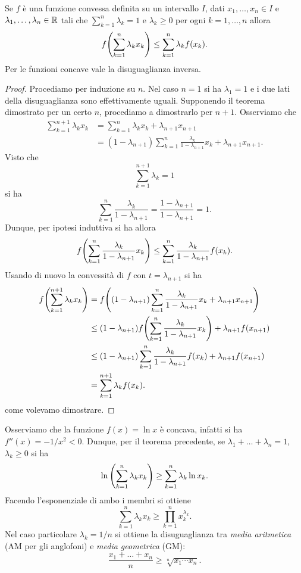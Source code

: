 \begin{theorem}
\mymark{*}
Se $f$ è una funzione convessa definita su un intervallo $I$, dati $x_1, \dots, x_n \in I$ e $\lambda_1, \dots, \lambda_n\in \mathbb R$ tali che $\sum_{k=1}^n \lambda_k = 1$ e $\lambda_k \ge 0$ per ogni $k=1, \dots, n$ allora
\[
  f{\left( \sum_{k=1}^n \lambda_k x_k \right)}
  \le \sum_{k=1}^n \lambda_k f(x_k).
\]
Per le funzioni concave vale la disuguaglianza inversa.
\end{theorem}
%
\begin{proof}
Procediamo per induzione su $n$. Nel caso $n=1$ si ha $\lambda_1=1$ e i due lati della disuguaglianza sono effettivamente uguali. Supponendo il teorema dimostrato per un certo $n$, procediamo a dimostrarlo per $n+1$.
Osserviamo che
\begin{align*}
  \sum_{k=1}^{n+1} \lambda_k x_k
  &= \sum_{k=1}^n \lambda_k x_k  + \lambda_{n+1} x_{n+1} \\
  &= (1-\lambda_{n+1})\sum_{k=1}^n\frac{\lambda_k}{1-\lambda_{n+1}} x_k + \lambda_{n+1} x_{n+1}.
\end{align*}
Visto che
\[
  \sum_{k=1}^{n+1} \lambda_k = 1
\]
si ha
\[
  \sum_{k=1}^n \frac{\lambda_k}{1-\lambda_{n+1}}
  = \frac{1-\lambda_{n+1}}{1-\lambda_{n+1}} = 1.
\]
Dunque, per ipotesi induttiva si ha allora
\[
  f{\left( \sum_{k=1}^n\frac{\lambda_k}{1-\lambda_{n+1}} x_k \right)}
  \le \sum_{k=1}^n \frac{\lambda_k}{1-\lambda_{n+1}}f(x_k).
\]
Usando di nuovo la convessità di $f$ con $t=\lambda_{n+1}$ si ha
\begin{align*}
f{\left( \sum_{k=1}^{n+1} \lambda_k x_k \right)}
&=f{\left( (1-\lambda_{n+1})\sum_{k=1}^n \frac{\lambda_k}{1-\lambda_{n+1}}x_k + \lambda_{n+1}x_{n+1} \right)}\\
&\le (1-\lambda_{n+1})f{\left( \sum_{k=1}^n \frac{\lambda_k}{1-\lambda_{n+1}}x_k \right)} + \lambda_{n+1}f(x_{n+1}) \\
&\le (1-\lambda_{n+1})\sum_{k=1}^n \frac{\lambda_k}{1-\lambda_{n+1}} f(x_k) + \lambda_{n+1} f(x_{n+1})\\
&= \sum_{k=1}^{n+1}\lambda_k f(x_k).
\end{align*}
come volevamo dimostrare.
\end{proof}


\begin{example}
\mymark{*}
Osserviamo che la funzione $f(x) = \ln x$ è concava, infatti si ha
$f''(x) = -1/x^2 < 0$. Dunque, per il teorema precedente, se $\lambda_1 + \dots + \lambda_n =1$, $\lambda_k \ge 0$ si ha
\[
    \ln{\left( \sum_{k=1}^n \lambda_k x_k \right)}
    \ge \sum_{k=1}^n \lambda_k \ln x_k.
\]
Facendo l'esponenziale di ambo i membri si ottiene
\[
  \sum_{k=1}^n \lambda_k x_k \ge \prod_{k=1}^n x_k^{\lambda_k}.
\]
Nel caso particolare $\lambda_k = 1/n$ si ottiene
la disuguaglianza tra \emph{media aritmetica} (AM per gli anglofoni)
e \emph{media geometrica}
%
%
%
%
%
(GM):
\[
  \frac{x_1 + \dots + x_n}{n} \ge \sqrt[n]{x_1\cdots x_n}.
\]
\end{example}

